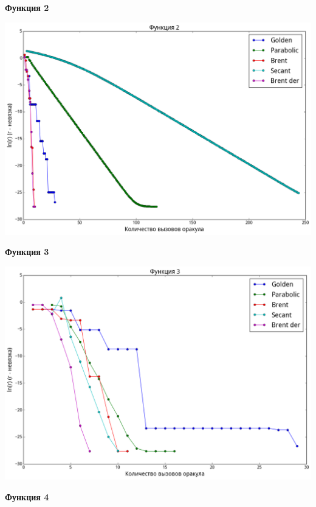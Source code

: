 \documentclass[12pt, a4paper]{article}
\begin{document}
        \textbf{Функция 2}

        \begin{center}\includegraphics[width=\picwidth]{pics/fun2_der.png}\end{center}

        \textbf{Функция 3}

        \begin{center}\includegraphics[width=\picwidth]{pics/fun3_der.png}\end{center}

        \textbf{Функция 4}
\end{document}
